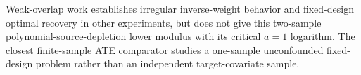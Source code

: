 Weak-overlap work establishes irregular inverse-weight behavior and fixed-design optimal recovery in other experiments, but does not give this two-sample polynomial-source-depletion lower modulus with its critical \(a=1\) logarithm. The closest finite-sample ATE comparator studies a one-sample unconfounded fixed-design problem rather than an independent target-covariate sample.